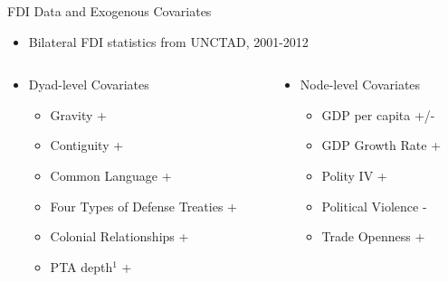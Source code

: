 \documentclass{beamer}
\begin{document}
\begin{frame}{FDI Data and Exogenous Covariates}

\begin{itemize}
\item{Bilateral FDI statistics from UNCTAD, 2001-2012}
\end{itemize}

\begin{columns}[T]
    \begin{column}{.5\textwidth}
\begin{itemize}
\item{Dyad-level Covariates}
\begin{itemize}
\item{Gravity +} 
\item{Contiguity +} 
\item{Common Language +} 
\item{Four Types of Defense Treaties +}  
\item{Colonial Relationships +}
 \item{PTA depth$^{1}$ + }
\end{itemize}
\end{itemize}
    \end{column}
    \begin{column}{.5\textwidth}
\begin{itemize}
\item{Node-level Covariates}
\begin{itemize}
\item{GDP per capita +/-} 
\item{GDP Growth Rate +} 
\item {Polity IV +} 
\item{Political Violence - } 
\item{Trade Openness +}
\end{itemize}
\end{itemize}
        \end{column}
  \end{columns}
 
  


\end{frame}
\end{document}
